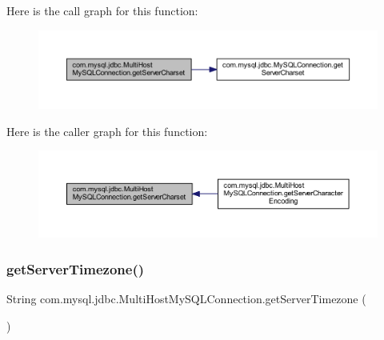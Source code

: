 Here is the call graph for this function\+:
\nopagebreak
\begin{figure}[H]
\begin{center}
\leavevmode
\includegraphics[width=350pt]{classcom_1_1mysql_1_1jdbc_1_1_multi_host_my_s_q_l_connection_ade6eec72969b91ca518b7750d0af4539_cgraph}
\end{center}
\end{figure}
Here is the caller graph for this function\+:
\nopagebreak
\begin{figure}[H]
\begin{center}
\leavevmode
\includegraphics[width=350pt]{classcom_1_1mysql_1_1jdbc_1_1_multi_host_my_s_q_l_connection_ade6eec72969b91ca518b7750d0af4539_icgraph}
\end{center}
\end{figure}
\mbox{\label{classcom_1_1mysql_1_1jdbc_1_1_multi_host_my_s_q_l_connection_a1aeab5021006a43eb885c10f945a747c}} 
\subsubsection{\texorpdfstring{get\+Server\+Timezone()}{getServerTimezone()}}
{\footnotesize\ttfamily String com.\+mysql.\+jdbc.\+Multi\+Host\+My\+S\+Q\+L\+Connection.\+get\+Server\+Timezone (\begin{DoxyParamCaption}{ }\end{DoxyParamCaption})}

